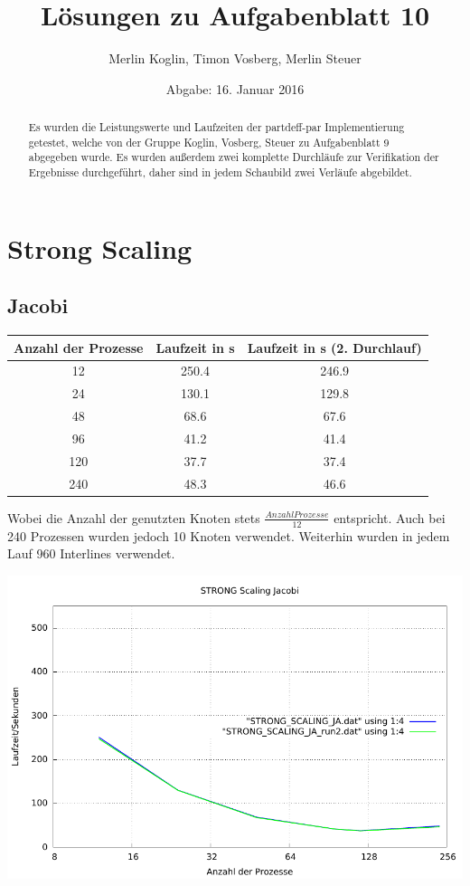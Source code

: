\documentclass[a4paper]{article}
\author{Merlin Koglin, Timon Vosberg, Merlin Steuer}
\date{Abgabe: 16. Januar 2016}
\title{Lösungen zu Aufgabenblatt 10}
\begin{document}
\maketitle
\tableofcontents

\begin{abstract}
Es wurden die Leistungswerte und Laufzeiten der partdeff-par Implementierung getestet, welche von der Gruppe Koglin, Vosberg, Steuer zu Aufgabenblatt 9 abgegeben wurde. Es wurden außerdem zwei komplette Durchläufe zur Verifikation der Ergebnisse durchgeführt, daher sind in jedem Schaubild zwei Verläufe abgebildet.
\end{abstract}

\newpage

\section{Strong Scaling}
\subsection{Jacobi}
\begin{tabular}{|c|c|c|}
\hline 
Anzahl der Prozesse & Laufzeit in s & Laufzeit in s (2. Durchlauf) \\ 
\hline 
12 & 250.4 & 246.9 \\ 
\hline 
24 & 130.1 & 129.8 \\ 
\hline 
48 & 68.6 & 67.6 \\ 
\hline 
96 & 41.2 & 41.4 \\ 
\hline 
120 & 37.7 & 37.4 \\ 
\hline 
240 & 48.3 & 46.6 \\ 
\hline
\end{tabular} 

Wobei die Anzahl der genutzten Knoten stets $\frac{Anzahl Prozesse}{12}$ entspricht. Auch bei 240 Prozessen wurden jedoch 10 Knoten verwendet. Weiterhin wurden in jedem Lauf 960 Interlines verwendet.

\includegraphics[scale=0.8]{img/STRONG_SCALING_JA_laufzeit.pdf}
\end{document}

